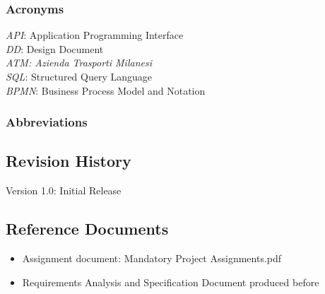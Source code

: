 \documentclass[12pt]{article}
\begin{document}
\subsubsection{Acronyms}
\textit{API}: Application Programming Interface\\
\textit{DD}: Design Document\\
\textit{ATM: Azienda Trasporti Milanesi}\\
\textit{SQL}: Structured Query Language\\
\textit{BPMN}: Business Process Model and Notation
\subsubsection{Abbreviations}


\subsection{Revision History}
Version 1.0: Initial Release

\subsection{Reference Documents}
\begin{itemize}
    \item Assignment document: Mandatory Project Assignments.pdf
    \item Requirements Analysis and Specification Document produced before
\end{itemize}
\end{document}

